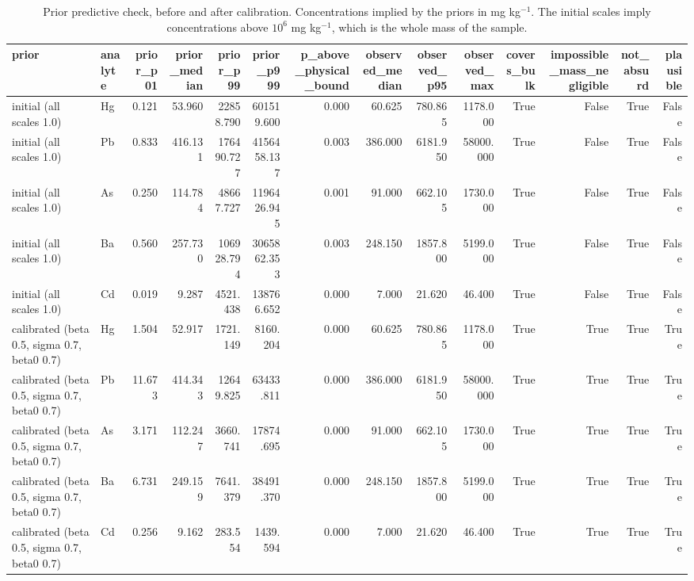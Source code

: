 \begin{table}[htbp]
\centering
\caption{Prior predictive check, before and after calibration. Concentrations implied by the priors in mg kg$^{-1}$. The initial scales imply concentrations above $10^6$ mg kg$^{-1}$, which is the whole mass of the sample.}
\label{tab:priorpred}
\footnotesize
\begin{tabular}{llrrrrrrrrrrrr}
\toprule
prior & analyte & prior\_p01 & prior\_median & prior\_p99 & prior\_p999 & p\_above\_physical\_bound & observed\_median & observed\_p95 & observed\_max & covers\_bulk & impossible\_mass\_negligible & not\_absurd & plausible \\
\midrule
initial (all scales 1.0) & Hg & 0.121 & 53.960 & 22858.790 & 601519.600 & 0.000 & 60.625 & 780.865 & 1178.000 & True & False & True & False \\
initial (all scales 1.0) & Pb & 0.833 & 416.131 & 176490.727 & 4156458.137 & 0.003 & 386.000 & 6181.950 & 58000.000 & True & False & True & False \\
initial (all scales 1.0) & As & 0.250 & 114.784 & 48667.727 & 1196426.945 & 0.001 & 91.000 & 662.105 & 1730.000 & True & False & True & False \\
initial (all scales 1.0) & Ba & 0.560 & 257.730 & 106928.794 & 3065862.353 & 0.003 & 248.150 & 1857.800 & 5199.000 & True & False & True & False \\
initial (all scales 1.0) & Cd & 0.019 & 9.287 & 4521.438 & 138766.652 & 0.000 & 7.000 & 21.620 & 46.400 & True & False & True & False \\
calibrated (beta 0.5, sigma 0.7, beta0 0.7) & Hg & 1.504 & 52.917 & 1721.149 & 8160.204 & 0.000 & 60.625 & 780.865 & 1178.000 & True & True & True & True \\
calibrated (beta 0.5, sigma 0.7, beta0 0.7) & Pb & 11.673 & 414.343 & 12649.825 & 63433.811 & 0.000 & 386.000 & 6181.950 & 58000.000 & True & True & True & True \\
calibrated (beta 0.5, sigma 0.7, beta0 0.7) & As & 3.171 & 112.247 & 3660.741 & 17874.695 & 0.000 & 91.000 & 662.105 & 1730.000 & True & True & True & True \\
calibrated (beta 0.5, sigma 0.7, beta0 0.7) & Ba & 6.731 & 249.159 & 7641.379 & 38491.370 & 0.000 & 248.150 & 1857.800 & 5199.000 & True & True & True & True \\
calibrated (beta 0.5, sigma 0.7, beta0 0.7) & Cd & 0.256 & 9.162 & 283.554 & 1439.594 & 0.000 & 7.000 & 21.620 & 46.400 & True & True & True & True \\
\bottomrule
\end{tabular}
\end{table}
